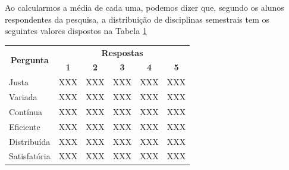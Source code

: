         Ao calcularmos a média de cada uma, podemos dizer que, segundo os alunos respondentes da pesquisa, a distribuição de disciplinas semestrais tem os seguintes valores dispostos na Tabela \ref{table:5.2_Opiniao}

        \begin{table}[]
            \centering
            \label{table:5.2_Opiniao}
            \begin{tabular}{@{}|lccccc|@{}}
                \toprule
                \multicolumn{1}{|c|}{\multirow{2}{*}{\textbf{Pergunta}}} & \multicolumn{5}{c|}{\textbf{Respostas}}                                                                                                                          \\
                \multicolumn{1}{|c|}{}                                   & \multicolumn{1}{c|}{\textbf{1}} & \multicolumn{1}{c|}{\textbf{2}} & \multicolumn{1}{c|}{\textbf{3}} & \multicolumn{1}{c|}{\textbf{4}} & \textbf{5}               \\ \midrule
                Justa                                                    & XXX                             & XXX                             & XXX                             & XXX                             & XXX                      \\ \midrule
                Variada                                                  & XXX                             & XXX                             & XXX                             & XXX                             & XXX                      \\ \midrule
                Contínua                                                 & XXX                             & XXX                             & XXX                             & XXX                             & XXX                      \\ \midrule
                Eficiente                                                & \multicolumn{1}{l}{XXX}         & \multicolumn{1}{l}{XXX}         & \multicolumn{1}{l}{XXX}         & \multicolumn{1}{l}{XXX}         & \multicolumn{1}{l|}{XXX} \\ \midrule
                Distribuída                                              & \multicolumn{1}{l}{XXX}         & \multicolumn{1}{l}{XXX}         & \multicolumn{1}{l}{XXX}         & \multicolumn{1}{l}{XXX}         & \multicolumn{1}{l|}{XXX} \\ \midrule
                Satisfatória                                             & \multicolumn{1}{l}{XXX}         & \multicolumn{1}{l}{XXX}         & \multicolumn{1}{l}{XXX}         & \multicolumn{1}{l}{XXX}         & \multicolumn{1}{l|}{XXX} \\ \bottomrule
            \end{tabular}
        \end{table}

